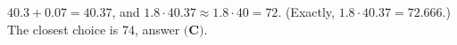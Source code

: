 $40.3+0.07=40.37$, and $1.8\cdot40.37\approx1.8\cdot40=72$. (Exactly, $1.8\cdot40.37=72.666$.) The closest choice is $\boxed{74}$, answer $\textbf{(C)}$.
